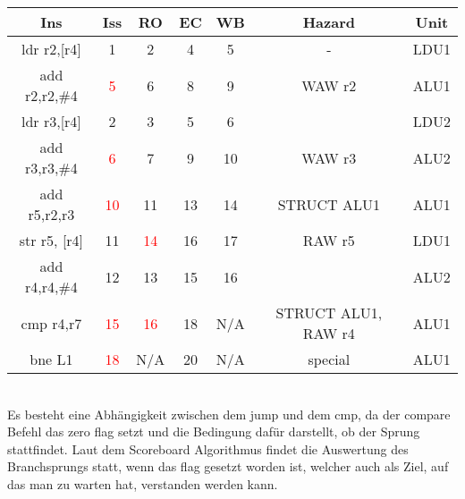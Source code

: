 \documentclass[a4paper,12pt,headsepline]{scrartcl}
\begin{document}

\begin{tabular}{|c|c|c|c|c|c|c|}
     \hline Ins&Iss&RO&EC&WB&Hazard&Unit\\
     \hline ldr r2,[r4]&1&2&4&5&-&LDU1  \\
     \hline add r2,r2,\#4&\textcolor{red}{5}&6&8&9&WAW r2&ALU1\\
     \hline ldr r3,[r4]&2&3&5&6&&LDU2\\
     \hline add r3,r3,\#4&\textcolor{red}{6}&7&9&10&WAW r3&ALU2\\
     \hline add r5,r2,r3&\textcolor{red}{10}&11&13&14&STRUCT ALU1&ALU1\\
     \hline str r5, [r4]&11&\textcolor{red}{14}&16&17&RAW r5&LDU1\\
     \hline add r4,r4,\#4&12&13&15&16&&ALU2\\
     \hline cmp r4,r7&\textcolor{red}{15}&\textcolor{red}{16}&18&N/A&STRUCT ALU1, RAW r4&ALU1\\
     \hline bne L1&\textcolor{red}{18}&N/A&20&N/A&special&ALU1\\
     \hline
\end{tabular}\\

Es besteht eine Abhängigkeit zwischen dem jump und dem cmp, da der compare Befehl das zero flag setzt und die Bedingung dafür darstellt, ob der Sprung stattfindet. Laut dem Scoreboard Algorithmus findet die Auswertung des Branchsprungs statt, wenn das flag gesetzt worden ist, welcher auch als Ziel, auf das man zu warten hat, verstanden werden kann.
\end{document}
